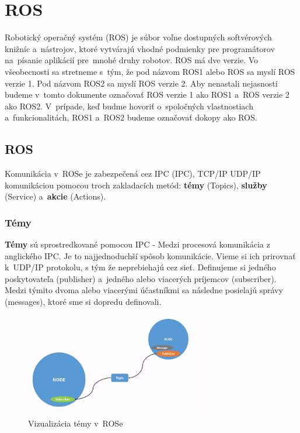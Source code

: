 \section{ROS}
\noindent Robotický operačný systém (\acrlong{ROS}) je súbor voľne dostupných softvérových knižníc a~nástrojov, ktoré vytvárajú
vhodné podmienky pre programátorov na~písanie aplikácií pre~mnohé druhy robotov. ROS má dve verzie. Vo všeobecnosti sa stretneme
s~tým, že pod názvom ROS1 alebo ROS sa myslí ROS verzie 1. Pod názvom ROS2 sa myslí ROS verzie 2. Aby nenastali nejasnosti
budeme v~tomto dokumente označovať ROS verzie 1 ako ROS1 a~ROS verzie 2 ako ROS2. V~prípade, keď budme hovoriť o~spoločných
vlastnostiach a~funkcionalitách, ROS1 a~ROS2 budeme označovať dokopy ako ROS.

\subsection{ROS}

\noindent Komunikácia v~ROSe je zabezpečená cez IPC (\acrlong{IPC}), TCP/IP UDP/IP komunikáciou pomocou troch zakladacích metód:
\textbf{témy} (Topics), \textbf{služby} (Service) a~\textbf{akcie} (Actions).

\subsubsection{Témy}

\textbf {Témy} sú sprostredkované pomocou IPC - Medzi procesová komunikácia z anglického \acrlong{IPC}. Je to najjednoduchší spôsob
komunikácie. Vieme si ich prirovnať k~UDP/IP protokolu, s tým že neprebiehajú cez sieť. Definujeme si jedného poskytovateľa (publisher)
a~jedného alebo viacerých príjemcov (subscriber). Medzi týmito dvoma alebo viacerými účastníkmi sa následne posielajú správy (messages),
ktoré sme si dopredu definovali.

\begin{figure}[h]
	\centering
	\includegraphics[width=8cm]{img/topicsExplanation.png}
	\caption{Vizualizácia témy v~ROSe~\cite{RosDoc}} \label{fig:topics} \end{figure}

